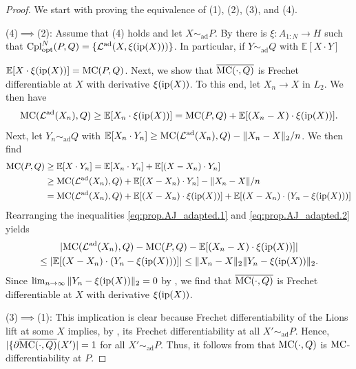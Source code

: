 \documentclass[a4paper]{amsart}
\numberwithin{theorem}{section}
\theoremstyle{definition}
\newcommand{\E}{\mathbb{E}}
\newcommand{\law}{\mathcal{L}}
\newcommand{\cpl}{\textup{Cpl}}
\newcommand{\cplopt}{\cpl_{\rm opt}}
\newcommand{\simad}{\sim_{\mathrm{ad}}}
\renewcommand{\H}{H}
\newcommand{\mc}{\textup{MC}}
\newcommand{\ip}{\textup{ip}}
\newcommand{\lawad}{\law^{\textup{ad}}}
\begin{document}
\begin{proof}
We start with proving the equivalence of (1), (2), (3), and (4).

(4)$\implies$(2):
Assume that (4) holds and let $X \simad P$. By  there is $\xi : A_{1:N} \to \H $ such that $\cplopt^N(P,Q) = \{ \lawad(X,\xi(\ip(X))) \}$.
In particular, if $Y \simad Q$ with $\E[X \cdot Y]$ 

$\E[X \cdot \xi(\ip(X))] = \mc(P,Q)$.  Next, we show that $\overline{\mc(\cdot,Q)}$ is Frechet differentiable at $X$ with derivative $\xi(\ip(X))$. 
To this end, let $X_n \to X$ in $L_2$.
We then have 
\begin{equation} \label{eq:prop.AJ_adapted.1}
    \mc(\lawad(X_n), Q) \ge \E[X_n  \cdot \xi(\ip(X))] = \mc(P,Q) + \E[ (X_n-X) \cdot \xi(\ip(X)) ].
\end{equation}
Next, let $Y_n \simad Q$ with $\E[X_n \cdot Y_n ] \ge \mc(\lawad(X_n),Q)- \|X_n-X\|_2 /n$. We then find
\begin{align}
    \label{eq:prop.AJ_adapted.2}
    \begin{split}
    \mc(P,Q) &\ge \E[ X \cdot Y_n ] = \E[ X_n \cdot Y_n ] + \E[  (X-X_n) \cdot Y_n ] \\
    & \ge \mc(\lawad(X_n),Q) + \E[  (X-X_n) \cdot Y_n ] - \| X_n-X\|/n \\
    &= \mc(\lawad(X_n),Q) + \E[(X-X_n) \cdot \xi(\ip(X))] + \E[ (X-X_n) \cdot (Y_n - \xi(\ip(X)) ) ]  
    \end{split}
\end{align}
Rearranging the inequalities \eqref{eq:prop.AJ_adapted.1} and \eqref{eq:prop.AJ_adapted.2} yields
\begin{multline*}
    |  \mc(\lawad(X_n), Q)  - \mc(P,Q) - \E[ (X_n-X) \cdot \xi(\ip(X)) ] | 
    \\
    \le |\E[ (X-X_n) \cdot (Y_n - \xi(\ip(X) ) ) ]| \le \| X_n -X \|_2 \| Y_n - \xi(\ip(X)) \|_2. 
\end{multline*}
Since $\lim_{n \to \infty} \|Y_n - \xi(\ip(X))\|_2 = 0$ by , we find that $\overline{\mc(\cdot,Q)}$ is Frechet differentiable at $X$ with derivative $\xi(\ip(X))$.

(3)$\implies$(1): This implication is clear because Frechet differentiability of the Lions lift at some $X$ implies, by , its Frechet differentiability at all $X' \simad P$. Hence, $|\{ \partial \overline{\mc(\cdot,Q)}(X')| = 1$ for all $X' \simad P$. Thus, it follows from  that $\mc(\cdot,Q)$ is $\mc$-differentiability at $P$.


\end{proof}
\end{document}

